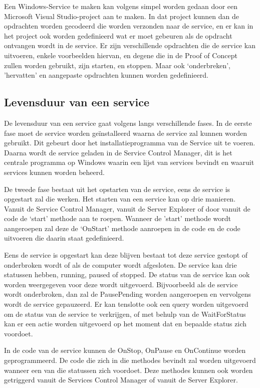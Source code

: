 Een Windows-Service te maken kan volgens \textcite{DevMozService} simpel worden gedaan door een Microsoft Visual Studio-project aan te maken. In dat project kunnen dan de opdrachten worden gecodeerd die worden verzonden naar de service, en er kan in het project ook worden gedefinieerd wat er moet gebeuren als de opdracht ontvangen wordt in de service. Er zijn verschillende opdrachten die de service kan uitvoeren, enkele voorbeelden hiervan, en degene die in de Proof of Concept zullen worden gebruikt, zijn starten, en stoppen. Maar ook ‘onderbreken’, 'hervatten’ en aangepaste opdrachten kunnen worden gedefinieerd. 

\subsection{Levensduur van een service}
De levensduur van een service gaat volgens \textcite{DevMozService} langs verschillende fases. In de eerste fase moet de service worden geïnstalleerd waarna de service zal kunnen worden gebruikt. Dit gebeurt door het installatieprogramma van de Service uit te voeren. Daarna wordt de service geladen in de Service Control Manager, dit is het centrale programma op Windows waarin een lijst van services bevindt en waaruit services kunnen worden beheerd. 

De tweede fase bestaat uit het opstarten van de service, eens de service is opgestart zal die werken. Het starten van een service kan op drie manieren. Vanuit de Service Control Manager, vanuit de Server Explorer of door vanuit de code de ‘start’ methode aan te roepen. Wanneer de 'start’ methode wordt aangeroepen zal deze de ‘OnStart’ methode aanroepen in de code en de code uitvoeren die daarin staat gedefinieerd. 

Eens de service is opgestart kan deze blijven bestaat tot deze service gestopt of onderbroken wordt of als de computer wordt afgesloten. De service kan drie statussen hebben, running, paused of stopped. De status van de service kan ook worden weergegeven voor deze wordt uitgevoerd. Bijvoorbeeld als de service wordt onderbroken, dan zal de PausePending worden aangeroepen en vervolgens wordt de service gepauzeerd. Er kan tenslotte ook een query worden uitgevoerd om de status van de service te verkrijgen, of met behulp van de WaitForStatus kan er een actie worden uitgevoerd op het moment dat en bepaalde status zich voordoet. 

In de code van de service kunnen de OnStop, OnPause en OnContinue worden geprogrammeerd. De code die zich in die methodes bevindt zal worden uitgevoerd wanneer een van die statussen zich voordoet. Deze methodes kunnen ook worden getriggerd vanuit de Services Control Manager of vanuit de Server Explorer.

